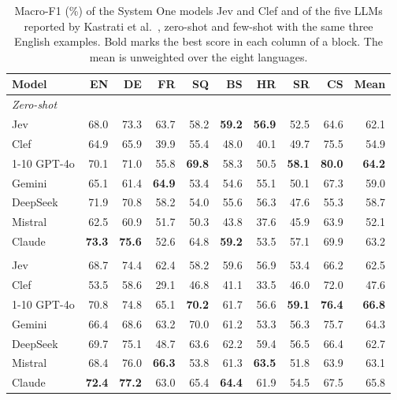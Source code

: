 \begin{table}[t]
\centering
\caption{Macro-F1 (\%) of the System One models Jev and Clef and of the five LLMs reported by Kastrati et al.~\cite{kastrati2026language}, zero-shot and few-shot with the same three English examples. Bold marks the best score in each column of a block. The mean is unweighted over the eight languages.}
\label{tab:zero-few-shot}
\begin{tabular}{lrrrrrrrrr}
\toprule
Model & EN & DE & FR & SQ & BS & HR & SR & CS & Mean \\
\midrule
\multicolumn{10}{l}{\textit{Zero-shot}} \\
Jev & 68.0 & 73.3 & 63.7 & 58.2 & \textbf{59.2} & \textbf{56.9} & 52.5 & 64.6 & 62.1 \\
Clef & 64.9 & 65.9 & 39.9 & 55.4 & 48.0 & 40.1 & 49.7 & 75.5 & 54.9 \\
\cmidrule(lr){1-10}
GPT-4o & 70.1 & 71.0 & 55.8 & \textbf{69.8} & 58.3 & 50.5 & \textbf{58.1} & \textbf{80.0} & \textbf{64.2} \\
Gemini & 65.1 & 61.4 & \textbf{64.9} & 53.4 & 54.6 & 55.1 & 50.1 & 67.3 & 59.0 \\
DeepSeek & 71.9 & 70.8 & 58.2 & 54.0 & 55.6 & 56.3 & 47.6 & 55.3 & 58.7 \\
Mistral & 62.5 & 60.9 & 51.7 & 50.3 & 43.8 & 37.6 & 45.9 & 63.9 & 52.1 \\
Claude & \textbf{73.3} & \textbf{75.6} & 52.6 & 64.8 & \textbf{59.2} & 53.5 & 57.1 & 69.9 & 63.2 \\
\addlinespace
\multicolumn{10}{l}{\textit{Few-shot}} \\
Jev & 68.7 & 74.4 & 62.4 & 58.2 & 59.6 & 56.9 & 53.4 & 66.2 & 62.5 \\
Clef & 53.5 & 58.6 & 29.1 & 46.8 & 41.1 & 33.5 & 46.0 & 72.0 & 47.6 \\
\cmidrule(lr){1-10}
GPT-4o & 70.8 & 74.8 & 65.1 & \textbf{70.2} & 61.7 & 56.6 & \textbf{59.1} & \textbf{76.4} & \textbf{66.8} \\
Gemini & 66.4 & 68.6 & 63.2 & 70.0 & 61.2 & 53.3 & 56.3 & 75.7 & 64.3 \\
DeepSeek & 69.7 & 75.1 & 48.7 & 63.6 & 62.2 & 59.4 & 56.5 & 66.4 & 62.7 \\
Mistral & 68.4 & 76.0 & \textbf{66.3} & 53.8 & 61.3 & \textbf{63.5} & 51.8 & 63.9 & 63.1 \\
Claude & \textbf{72.4} & \textbf{77.2} & 63.0 & 65.4 & \textbf{64.4} & 61.9 & 54.5 & 67.5 & 65.8 \\
\bottomrule
\end{tabular}
\end{table}
